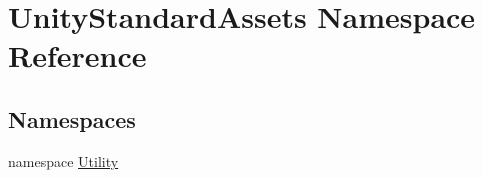 \hypertarget{namespace_unity_standard_assets}{}\section{Unity\+Standard\+Assets Namespace Reference}
\label{namespace_unity_standard_assets}
\subsection*{Namespaces}
\begin{DoxyCompactItemize}
\item 
namespace \hyperlink{namespace_unity_standard_assets_1_1_utility}{Utility}
\end{DoxyCompactItemize}
